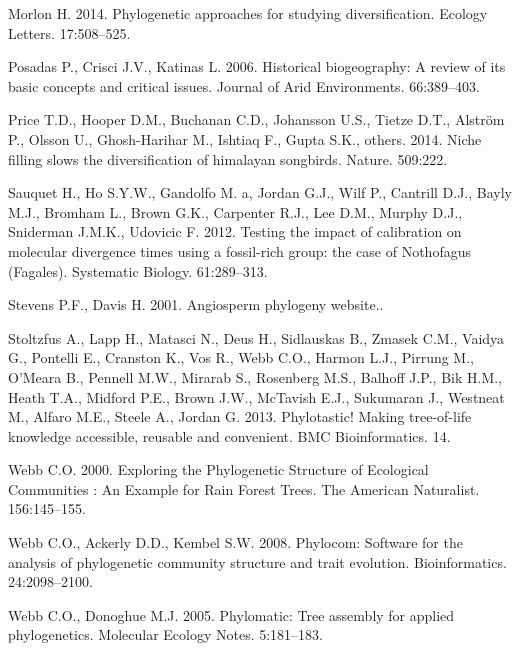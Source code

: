 \documentclass[]{article}
\begin{document}
\leavevmode\hypertarget{ref-Morlon2014}{}%
Morlon H. 2014. Phylogenetic approaches for studying diversification. Ecology Letters. 17:508--525.

\leavevmode\hypertarget{ref-posadas2006historical}{}%
Posadas P., Crisci J.V., Katinas L. 2006. Historical biogeography: A review of its basic concepts and critical issues. Journal of Arid Environments. 66:389--403.

\leavevmode\hypertarget{ref-price2014niche}{}%
Price T.D., Hooper D.M., Buchanan C.D., Johansson U.S., Tietze D.T., Alström P., Olsson U., Ghosh-Harihar M., Ishtiaq F., Gupta S.K., others. 2014. Niche filling slows the diversification of himalayan songbirds. Nature. 509:222.

\leavevmode\hypertarget{ref-Sauquet2012c}{}%
Sauquet H., Ho S.Y.W., Gandolfo M. a, Jordan G.J., Wilf P., Cantrill D.J., Bayly M.J., Bromham L., Brown G.K., Carpenter R.J., Lee D.M., Murphy D.J., Sniderman J.M.K., Udovicic F. 2012. Testing the impact of calibration on molecular divergence times using a fossil-rich group: the case of Nothofagus (Fagales). Systematic Biology. 61:289--313.

\leavevmode\hypertarget{ref-stevens2001apw}{}%
Stevens P.F., Davis H. 2001. Angiosperm phylogeny website..

\leavevmode\hypertarget{ref-Stoltzfus2013}{}%
Stoltzfus A., Lapp H., Matasci N., Deus H., Sidlauskas B., Zmasek C.M., Vaidya G., Pontelli E., Cranston K., Vos R., Webb C.O., Harmon L.J., Pirrung M., O'Meara B., Pennell M.W., Mirarab S., Rosenberg M.S., Balhoff J.P., Bik H.M., Heath T.A., Midford P.E., Brown J.W., McTavish E.J., Sukumaran J., Westneat M., Alfaro M.E., Steele A., Jordan G. 2013. Phylotastic! Making tree-of-life knowledge accessible, reusable and convenient. BMC Bioinformatics. 14.

\leavevmode\hypertarget{ref-Webb2000}{}%
Webb C.O. 2000. Exploring the Phylogenetic Structure of Ecological Communities : An Example for Rain Forest Trees. The American Naturalist. 156:145--155.

\leavevmode\hypertarget{ref-Webb2008}{}%
Webb C.O., Ackerly D.D., Kembel S.W. 2008. Phylocom: Software for the analysis of phylogenetic community structure and trait evolution. Bioinformatics. 24:2098--2100.

\leavevmode\hypertarget{ref-webb2005phylomatic}{}%
Webb C.O., Donoghue M.J. 2005. Phylomatic: Tree assembly for applied phylogenetics. Molecular Ecology Notes. 5:181--183.

\newpage
\end{document}
